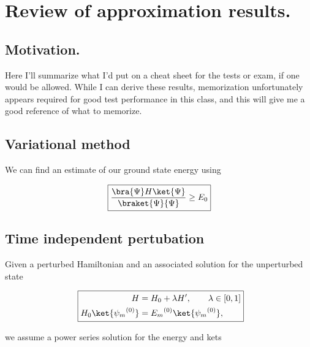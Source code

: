 
%

\chapter{Review of approximation results.}
\label{chap:qmTwoReview}
{}
\date{Nov 6, 2011}

\beginArtWithToc

\section{Motivation.}

Here I'll summarize what I'd put on a cheat sheet for the tests or exam, if one would be allowed.  While I can derive these results, memorization unfortunately appears required for good test performance in this class, and this will give me a good reference of what to memorize.

\section{Variational method}

We can find an estimate of our ground state energy using

\begin{equation}\label{eqn:qmTwoReview:n}
\boxed{
\frac{
\bra{\Psi} H \ket{\Psi}
}{
\braket{\Psi}{\Psi}
}
\ge E_0
}
\end{equation}

\section{Time independent pertubation}

Given a perturbed Hamiltonian and an associated solution for the unperturbed state

\begin{equation}\label{eqn:qmTwoReview:n}\
\boxed{
\begin{aligned}
H &= H_0 + \lambda H', \qquad \lambda \in [0,1] \\
H_0 \ket{{\psi_m}^{(0)}} &= {E_m}^{(0)} \ket{{\psi_m}^{(0)}},
\end{aligned}
}
\end{equation}

we assume a power series solution for the energy and kets

